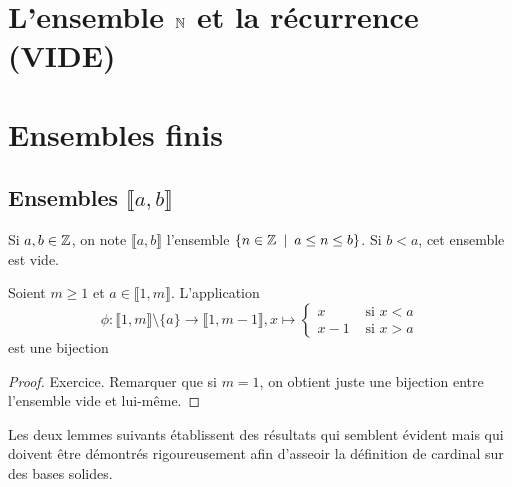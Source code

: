 
\section{L'ensemble $\N$ et la récurrence (VIDE)}
\index{$\N$}

\section{Ensembles finis}

\subsection{Ensembles $\llbracket a,b\rrbracket$}

Si $a, b\in \mathbb{Z}$, on note $\llbracket a,b\rrbracket$ l'ensemble $\{n\in \mathbb{Z}\:\mid\: a\leq n \leq b\}$. Si $b<a$, cet ensemble est vide.

\begin{lemme} Soient $m\geq 1$ et $a\in \llbracket 1,m\rrbracket$. L'application 
\[
\phi : \llbracket 1,m\rrbracket \setminus \{a\} \to \llbracket 1,m-1\rrbracket, 
x\mapsto \begin{cases}x & \text{ si }x<a\\x-1 & \text{ si }x>a\end{cases}
\]
est une bijection
\end{lemme}
\begin{proof} Exercice. Remarquer que si $m=1$, on obtient juste une bijection entre l'ensemble vide et lui-même.
\end{proof}


Les deux lemmes suivants établissent des résultats qui semblent \og évident\fg{} mais qui doivent être démontrés rigoureusement afin d'asseoir la définition de cardinal sur des bases solides.

